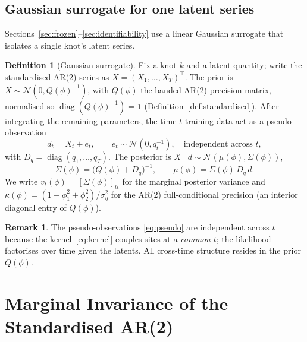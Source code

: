 \documentclass[11pt]{article}
\theoremstyle{definition}
\newtheorem{definition}{Definition}
\newtheorem{remark}{Remark}
\newcommand{\Norm}{\mathcal{N}}
\begin{document}
\subsection{Gaussian surrogate for one latent series}
\label{subsec:surrogate}

Sections~\ref{sec:frozen}--\ref{sec:identifiability} use a linear
Gaussian surrogate that isolates a single knot's latent series.

\begin{definition}[Gaussian surrogate]
\label{def:surrogate}
Fix a knot $k$ and a latent quantity; write the standardised AR(2)
series as $X = (X_1, \dots, X_T)^\top$. The prior is
$X \sim \Norm(0, Q(\phi)^{-1})$, with $Q(\phi)$ the banded AR(2)
precision matrix, normalised so $\operatorname{diag}(Q(\phi)^{-1}) =
\mathbf 1$ (Definition~\ref{def:standardised}). After integrating the
remaining parameters, the time-$t$ training data act as a pseudo-%
observation
\begin{equation}
  d_t = X_t + e_t, \qquad e_t \sim \Norm(0, q_t^{-1}),
  \quad \text{independent across } t,
  \label{eq:pseudo}
\end{equation}
with $D_q = \operatorname{diag}(q_1, \dots, q_T)$. The posterior is
$X \mid d \sim \Norm(\mu(\phi), \Sigma(\phi))$,
\begin{equation}
  \Sigma(\phi) = \big(Q(\phi) + D_q\big)^{-1}, \qquad
  \mu(\phi) = \Sigma(\phi)\, D_q\, d.
  \label{eq:surrogate-post}
\end{equation}
We write $v_t(\phi) = [\Sigma(\phi)]_{tt}$ for the marginal posterior
variance and
$\kappa(\phi) = (1 + \phi_1^2 + \phi_2^2)/\sigma_\eta^2$
for the AR(2) full-conditional precision (an interior diagonal entry
of $Q(\phi)$).
\end{definition}

\begin{remark}
The pseudo-observations \eqref{eq:pseudo} are independent across $t$
because the kernel~\eqref{eq:kernel} couples sites at a \emph{common}
$t$; the likelihood factorises over time given the latents. All
cross-time structure resides in the prior $Q(\phi)$.
\end{remark}

\section{Marginal Invariance of the Standardised AR(2)}
\label{sec:ar2-construction}
\end{document}
